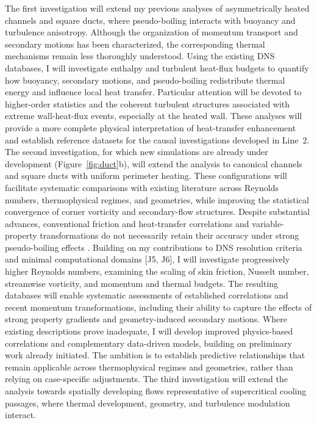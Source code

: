 \documentclass[11pt]{article}
\begin{document}
The first investigation will extend my previous analyses of asymmetrically heated channels and square ducts, where pseudo-boiling interacts with buoyancy and turbulence anisotropy.
Although the organization of momentum transport and secondary motions has been characterized, the corresponding thermal mechanisms remain less thoroughly understood.
Using the existing DNS databases, I will investigate enthalpy and turbulent heat-flux budgets to quantify how buoyancy, secondary motions, and pseudo-boiling redistribute thermal energy and influence local heat transfer.
Particular attention will be devoted to higher-order statistics and the coherent turbulent structures associated with extreme wall-heat-flux events, especially at the heated wall.
These analyses will provide a more complete physical interpretation of heat-transfer enhancement and establish reference datasets for the causal investigations developed in Line~2.
The second investigation, for which new simulations are already under development (Figure~\ref{fig:duct}b), will extend the analysis to canonical channels and square ducts with uniform perimeter heating.
These configurations will facilitate systematic comparisons with existing literature across Reynolds numbers, thermophysical regimes, and geometries, while improving the statistical convergence of corner vorticity and secondary-flow structures.
Despite substantial advances, conventional friction and heat-transfer correlations and variable-property transformations do not necessarily retain their accuracy under strong pseudo-boiling effects \cite{Modesti2026,Li2025}.
Building on my contributions to DNS resolution criteria and minimal computational domains [J5, J6], I will investigate progressively higher Reynolds numbers, examining the scaling of skin friction, Nusselt number, streamwise vorticity, and momentum and thermal budgets.
The resulting databases will enable systematic assessments of established correlations and recent momentum transformations, including their ability to capture the effects of strong property gradients and geometry-induced secondary motions.
Where existing descriptions prove inadequate, I will develop improved physics-based correlations and complementary data-driven models, building on preliminary work already initiated.
The ambition is to establish predictive relationships that remain applicable across thermophysical regimes and geometries, rather than relying on case-specific adjustments.
The third investigation will extend the analysis towards spatially developing flows representative of supercritical cooling passages, where thermal development, geometry, and turbulence modulation interact.
\end{document}
